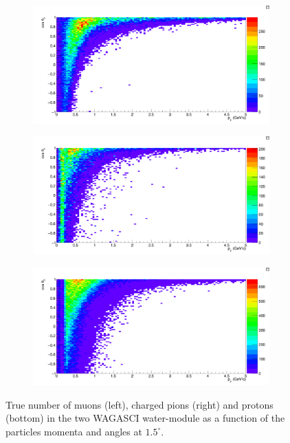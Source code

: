 \begin{figure}
  \centering
  \begin{subfigure}{.49\textwidth}
    \includegraphics[width=\linewidth]{fig/TrueInteractions_Muon.pdf}
  \end{subfigure}
  \begin{subfigure}{.49\textwidth}
    \includegraphics[width=\linewidth]{fig/TrueInteractions_Pion.pdf}
  \end{subfigure}
  \begin{subfigure}{.49\textwidth}
    \includegraphics[width=\linewidth]{fig/TrueInteractions_Proton.pdf}
  \end{subfigure}
  \caption{\label{fig:trueinteraction_particle} True number of muons (left), charged pions (right) and protons (bottom) in the two WAGASCI water-module as a function of the particles momenta and angles at $1.5^{\circ}$.}
\end{figure}


